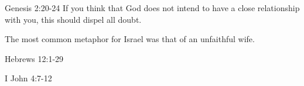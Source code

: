 \begin{discussion}



Genesis 2:20-24 If you think that God does not intend to have a close relationship with you, this should dispel all doubt.

The most common metaphor for Israel was that of an unfaithful wife.


Hebrews 12:1-29


I John 4:7-12

\end{discussion}
